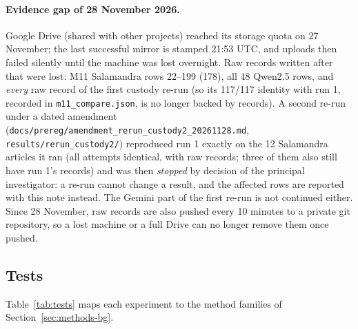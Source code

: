 \documentclass[10pt,a4paper]{article}
\begin{document}
\paragraph{Evidence gap of 28 November 2026.} Google Drive (shared with other projects) reached its storage quota on
27 November; the last successful mirror is stamped 21:53 UTC, and uploads then failed silently until the machine was
lost overnight. Raw records written after that were lost: M11 Salamandra rows 22--199 (178), all 48 Qwen2.5 rows, and
\emph{every} raw record of the first custody re-run (so its 117/117 identity with run 1, recorded in
\texttt{m11\_compare.json}, is no longer backed by records). A second re-run under a dated amendment
(\texttt{docs/prereg/amendment\_rerun\_custody2\_20261128.md}, \texttt{results/rerun\_custody2/}) reproduced run 1
exactly on the 12 Salamandra articles it ran (all attempts identical, with raw records; three of them also still have
run 1's records) and was then \emph{stopped} by decision of the principal investigator: a re-run cannot change a result, and
the affected rows are reported with this note instead. The Gemini part of the first re-run is not continued either. Since
28 November, raw records are also pushed every 10 minutes to a private git repository, so a lost machine or a full
Drive can no longer remove them once pushed.

\subsection{Tests}
Table~\ref{tab:tests} maps each experiment to the method families of Section~\ref{sec:methods-bg}.
\end{document}
